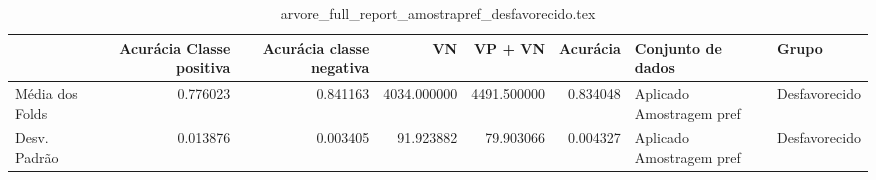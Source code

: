 \begin{table}
\centering
\caption{arvore_full_report_amostrapref_desfavorecido.tex}
\label{arvore_full_report_amostrapref_desfavorecido.tex}
\begin{tabular}{lrrrrrll}
\toprule
{}               &  Acurácia Classe positiva &  Acurácia classe negativa &          VN  &     VP + VN  &  Acurácia &         Conjunto de dados &          Grupo \\
\midrule
Média dos Folds &                  0.776023 &                  0.841163 &  4034.000000 &  4491.500000 &  0.834048 &  Aplicado Amostragem pref &  Desfavorecido \\
Desv. Padrão    &                  0.013876 &                  0.003405 &    91.923882 &    79.903066 &  0.004327 &  Aplicado Amostragem pref &  Desfavorecido \\
\bottomrule
\end{tabular}
\end{table}
